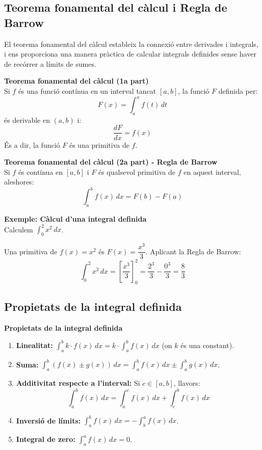 \documentclass[12pt]{article}
\begin{document}
\subsection{Teorema fonamental del càlcul i Regla de Barrow}

El teorema fonamental del càlcul estableix la connexió entre derivades i integrals, i ens proporciona una manera pràctica de calcular integrals definides sense haver de recórrer a límits de sumes.

\begin{concept}
\textbf{Teorema fonamental del càlcul (1a part)}\\
Si $f$ és una funció contínua en un interval tancat $[a,b]$, la funció $F$ definida per:
\[
F(x) = \int_a^x f(t)\,dt
\]
és derivable en $(a,b)$ i:
\[
\boxed{\dfrac{dF}{dx} = f(x)}
\]
És a dir, la funció $F$ és una primitiva de $f$.
\end{concept}

\begin{concept}
\textbf{Teorema fonamental del càlcul (2a part) - Regla de Barrow}\\
Si $f$ és contínua en $[a,b]$ i $F$ és qualsevol primitiva de $f$ en aquest interval, aleshores:
\[
\boxed{\int_a^b f(x)\,dx = F(b) - F(a)}
\]
\end{concept}

\begin{exemple}
\textbf{Exemple: Càlcul d'una integral definida}\\
Calculem $\displaystyle \int_0^2 x^2\,dx$.

Una primitiva de $f(x)=x^2$ és $F(x)=\dfrac{x^3}{3}$. Aplicant la Regla de Barrow:
\[
\int_0^2 x^2\,dx = \left[\frac{x^3}{3}\right]_0^2 = \frac{2^3}{3} - \frac{0^3}{3} = \frac{8}{3}
\]
\end{exemple}

\subsection{Propietats de la integral definida}

\begin{concept}
\textbf{Propietats de la integral definida}
\begin{enumerate}
    \item \textbf{Linealitat:} $\displaystyle \int_a^b k\cdot f(x)\,dx = k\cdot \int_a^b f(x)\,dx$ (on $k$ és una constant).
    \item \textbf{Suma:} $\displaystyle \int_a^b (f(x) \pm g(x))\,dx = \int_a^b f(x)\,dx \pm \int_a^b g(x)\,dx$.
    \item \textbf{Additivitat respecte a l'interval:} Si $c \in [a,b]$, llavors:
    \[
    \int_a^b f(x)\,dx = \int_a^c f(x)\,dx + \int_c^b f(x)\,dx
    \]
    \item \textbf{Inversió de límits:} $\displaystyle \int_a^b f(x)\,dx = -\int_b^a f(x)\,dx$.
    \item \textbf{Integral de zero:} $\displaystyle \int_a^a f(x)\,dx = 0$.
\end{enumerate}
\end{concept}
\end{document}
